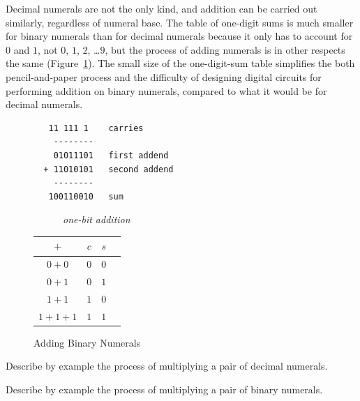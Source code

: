 Decimal numerals are not the only kind,
and addition can be carried out similarly, regardless of numeral base.
The table of one-digit sums is much smaller for binary numerals
than for decimal numerals because it only has to account for $0$ and $1$,
not $0$, $1$, $2$, \dots $9$, but
the process of adding numerals is in other respects
the same (Figure~\ref{fig:adding-binary-numerals}).
The small size of the one-digit-sum table simplifies the
both pencil-and-paper process and the difficulty of designing
digital circuits for performing addition on binary numerals, compared to what
it would be for decimal numerals.

\begin{figure}[!tbp]
\begin{center}
\begin{minipage}[b]{0.4\textwidth}
\begin{verbatim}
   11 111 1    carries
    --------
    01011101   first addend
  + 11010101   second addend
    --------
   100110010   sum
\end{verbatim}
\end{minipage}
\hfill
\begin{minipage}[b]{0.4\textwidth}
~~~~~~\emph{one-bit addition}\\
\vspace{.05 in}
\begin{tabular}{|c|c|c|c}
 \hline
 $+$      & $c$ & $s$ \\
 \hline
 $0+0$    & $0$ & $0$ \\
 \hline
 $0+1$    & $0$ & $1$ \\
 \hline
 $1+1$    & $1$ & $0$ \\
 \hline
 $1+1+1$  & $1$ & $1$ \\
 \hline
\end{tabular}
\end{minipage}
\end{center}
\caption{Adding Binary Numerals}
\label{fig:adding-binary-numerals}
\end{figure}

\begin{ExerciseList}
\Exercise Describe by example the process of multiplying a pair of decimal numerals.

\Exercise Describe by example the process of multiplying a pair of binary numerals.
\end{ExerciseList}

